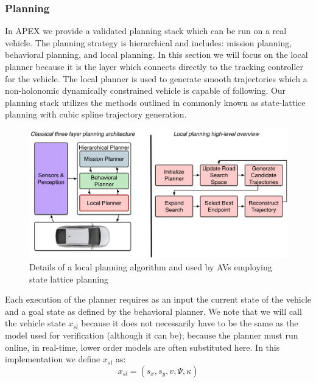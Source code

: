 \subsubsection{Planning}
In APEX we provide a validated planning stack which can be run on a real vehicle. The planning strategy is hierarchical and includes: mission planning, behavioral planning, and local planning. In this section we will focus on the local planner because it is the layer which connects directly to the tracking controller for the vehicle. The local planner is used to generate smooth trajectories which a non-holonomic dynamically constrained vehicle is capable of following. Our planning stack utilizes the methods outlined in 
\cite{McNaughton_2011_6927} commonly known as state-lattice planning with cubic spline trajectory generation.
\begin{figure}[t]
	\includegraphics[width=\columnwidth]{figures/planning.png}
	\caption{Details of a local planning algorithm and used by AVs employing state lattice planning}
	\vspace{-10pt}
	\label{fig:planning}
\end{figure}

Each execution of the planner requires as an input the current state of the vehicle and a goal state as defined by the behavioral planner. We note that we will call the vehicle state $x_{sl}$ because it does not necessarily have to be the same as the model used for verification (although it can be); because the planner must run online, in real-time, lower order models are often substituted here. In this implementation we define $x_{sl}$ as:
\begin{equation}
	x_{sl}=(s_x, s_y, v, \Psi, \kappa)
\end{equation}

